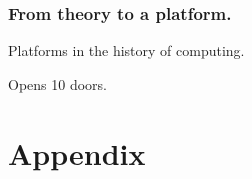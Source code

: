 \subsection{From theory to a platform.}


Platforms in the history of computing.


Opens 10 doors.



\chapter{Appendix}

%

